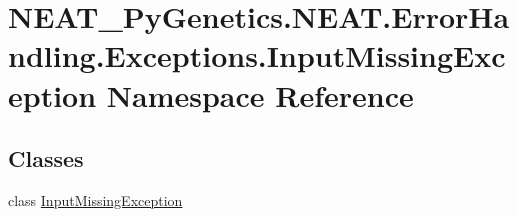 \hypertarget{namespaceNEAT__PyGenetics_1_1NEAT_1_1ErrorHandling_1_1Exceptions_1_1InputMissingException}{}\section{N\+E\+A\+T\+\_\+\+Py\+Genetics.\+N\+E\+A\+T.\+Error\+Handling.\+Exceptions.\+Input\+Missing\+Exception Namespace Reference}
\label{namespaceNEAT__PyGenetics_1_1NEAT_1_1ErrorHandling_1_1Exceptions_1_1InputMissingException}
\subsection*{Classes}
\begin{DoxyCompactItemize}
\item 
class \hyperlink{classNEAT__PyGenetics_1_1NEAT_1_1ErrorHandling_1_1Exceptions_1_1InputMissingException_1_1InputMissingException}{Input\+Missing\+Exception}
\end{DoxyCompactItemize}
